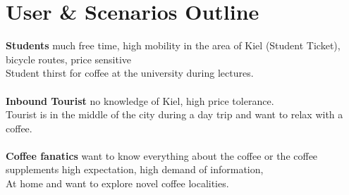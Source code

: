 \section*{User \& Scenarios Outline} 
\textbf{Students} much free time, high mobility in the area of Kiel (Student Ticket), bicycle routes, price sensitive\\
Student thirst for coffee at the university during lectures.\\\\
\textbf{Inbound Tourist} no knowledge of Kiel, high price tolerance. \\
Tourist is in the middle of the city during a day trip and want to relax with a coffee.\\\\
\textbf{Coffee fanatics} want to know everything about the coffee or the coffee supplements high expectation, high demand of information, \\
At home and want to explore novel coffee localities.\\
\newpage